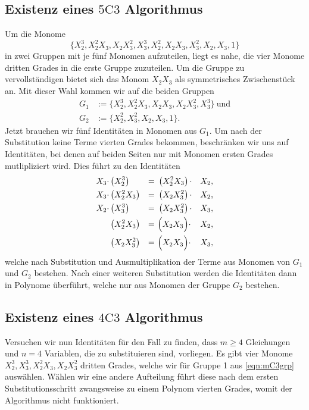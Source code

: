 \documentclass[a4paper,oneside, 11pt, openany%
]{article}
\newcommand{\coloneqq}{:=}
\theoremstyle{custom}
\theoremstyle{custom}
\begin{document}
\subsection{Existenz eines $5\text{C}3$ Algorithmus}\label{sec:5C3}
Um die Monome 
\begin{equation*}
	\{X_{2}^3,X_{2}^2X_{3},X_{2}X_{3}^2,X_{3}^3,X_{2}^2,X_{2}X_{3},X_{3}^2,X_{2},X_{3},1\}
\end{equation*}
in zwei Gruppen mit je fünf Monomen aufzuteilen, liegt es nahe, die vier Monome dritten Grades
in die erste Gruppe zuzuteilen. Um die Gruppe zu vervollständigen bietet sich das Monom $X_{2}X_{3}$ als symmetrisches Zwischenstück an.
Mit dieser Wahl kommen wir auf die beiden Gruppen
\begin{equation*}\label{eqn:5C3grp}
	\begin{alignedat}{1}
		G_1 &\coloneqq \{X_{2}^3,X_{2}^2X_{3},X_{2}X_{3},X_{2}X_{3}^2,X_{3}^3\} \ \text{und} \\
		G_2 &\coloneqq \{X_{2}^2,X_{3}^2,X_{2},X_{3},1\}.
	\end{alignedat}
\end{equation*}
Jetzt brauchen wir fünf Identitäten in Monomen aus $G_1$. Um nach der Substitution keine Terme vierten Grades bekommen, beschränken wir uns auf Identitäten, bei denen auf beiden Seiten nur mit Monomen ersten Grades mutlipliziert wird.
Dies führt zu den Identitäten
\begin{gather*}
	\begin{alignedat}{-1}
		X_{3} \cdot& \left( X_{2}^{3}\right)  &=&\ \left( X_{2}^{2}X_{3}\right) \cdot& X_{2},\\
		X_{3}\cdot& \left(X_{2}^{2}X_{3}\right) &=&\ \left(X_{2}X_{3}^{2}\right) \cdot& X_{2},\\
		X_{2}\cdot&\left( X_{3}^{3}\right) &=&\ \left(X_{2}X_{3}^{2}\right) \cdot& X_{3},\\
		&\left(X_{2}^{2}X_{3}\right)  &=&\ \Bigl(X_{2}X_{3}\Bigr) \cdot& X_{2},\\
		&\left(X_{2}X_{3}^{2}\right)  &=&\ \Bigl(X_{2}X_{3}\Bigr) \cdot& X_{3},\\
	\end{alignedat}
\end{gather*}
welche nach Substitution und Ausmultiplikation der Terme aus Monomen von $G_1$ und $G_2$ bestehen.
Nach einer weiteren Substitution werden die Identitäten dann in Polynome überführt, welche nur aus Monomen der Gruppe $G_2$ bestehen.

	\subsection{Existenz eines $4\text{C}3$ Algorithmus}\label{sec:4C3}
	Versuchen wir nun Identitäten für den Fall zu finden, dass $m\geq4$ Gleichungen und $n=4$ Variablen, die zu substituieren sind, vorliegen. Es gibt vier Monome $X_{2}^3, X_{3}^3, X_{2}^2X_{3}, X_{2}X_{3}^2$ dritten Grades, welche wir für Gruppe 1 aus \ref{eqn:mC3grp} auswählen. Wählen wir eine andere Aufteilung führt diese nach dem ersten Substitutionsschritt zwangsweise zu einem Polynom vierten Grades, womit der Algorithmus nicht funktioniert.
	
\end{document}
